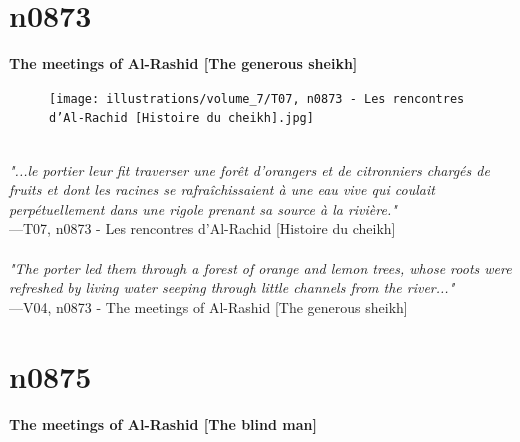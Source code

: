 \documentclass[../Carre_nights.tex]{subfiles}
\begin{document}
\newpage

\section{n0873}
\textbf{\Large{The meetings of Al-Rashid [The generous sheikh]}} \\

\begin{figure}[ht]
\centering
\texttt{[image: illustrations/volume\_7/T07, n0873 - Les rencontres d’Al-Rachid [Histoire du cheikh].jpg]}
\end{figure}

\textit{\\
"...le portier leur fit traverser une forêt d’orangers et de citronniers chargés de fruits et dont les racines se rafraîchissaient à une eau vive qui coulait perpétuellement dans une rigole prenant sa source à la rivière."} \\
—T07, n0873 - Les rencontres d’Al-Rachid [Histoire du cheikh] \\~\\
\textit{"The porter led them through a forest of orange and lemon trees, whose roots were refreshed by living water seeping through little channels from the river..."} \\
—V04, n0873 - The meetings of Al-Rashid [The generous sheikh]

\newpage

\section{n0875}
\textbf{\Large{The meetings of Al-Rashid [The blind man]}} \\
\end{document}
